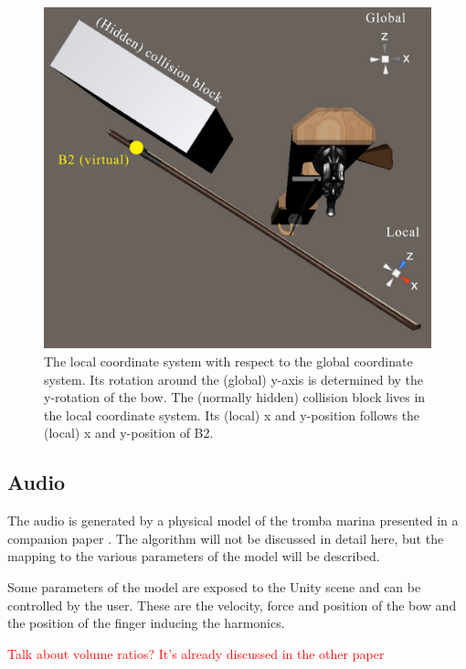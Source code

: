 \documentclass[dvipsnames, pdftex]{article}
\def\SWcomment[#1]{\textcolor{Red}{#1}}
\begin{document}
\begin{figure}[ht]\includegraphics[width=1.0\columnwidth]{SMC 2020 paper template LaTeX/globalLocal.pdf}
\centering
  \caption{The local coordinate system with respect to the global coordinate system. Its rotation around the (global) y-axis is determined by the y-rotation of the bow. The (normally hidden) collision block lives in the local coordinate system. Its (local) x and y-position follows the (local) x and y-position of B2. \label{fig:localGlobal}}
\end{figure}

\subsection{Audio}
The audio is generated by a physical model of the tromba marina presented in a companion paper \cite{Willemsen2020}. The algorithm will not be discussed in detail here, but the mapping to the various parameters of the model will be described. 

Some parameters of the model are exposed to the Unity scene and can be controlled by the user. These are the velocity, force and position of the bow and the position of the finger inducing the harmonics.

\SWcomment[Talk about volume ratios? It's already discussed in the other paper]
\end{document}
